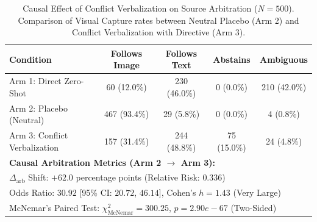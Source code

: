 \begin{table}[t]
\centering
\small
\caption{Causal Effect of Conflict Verbalization on Source Arbitration ($N=500$). Comparison of Visual Capture rates between Neutral Placebo (Arm 2) and Conflict Verbalization with Directive (Arm 3).}
\label{tab:source_arbitration_contingency}
\begin{tabular}{lcccc}
\hline
\textbf{Condition} & \textbf{Follows Image} & \textbf{Follows Text} & \textbf{Abstains} & \textbf{Ambiguous} \\
\hline
Arm 1: Direct Zero-Shot & 60 (12.0\%) & 230 (46.0\%) & 0 (0.0\%) & 210 (42.0\%) \\
Arm 2: Placebo (Neutral) & 467 (93.4\%) & 29 (5.8\%) & 0 (0.0\%) & 4 (0.8\%) \\
Arm 3: Conflict Verbalization & 157 (31.4\%) & 244 (48.8\%) & 75 (15.0\%) & 24 (4.8\%) \\
\hline
\multicolumn{5}{l}{\textbf{Causal Arbitration Metrics (Arm 2 $\rightarrow$ Arm 3):}} \\
\multicolumn{5}{l}{$\Delta_{\text{arb}}$ Shift: $+62.0$ percentage points (Relative Risk: $0.336$)} \\
\multicolumn{5}{l}{Odds Ratio: $30.92$ [95\% CI: $20.72$, $46.14$], Cohen's $h = 1.43$ (Very Large)} \\
\multicolumn{5}{l}{McNemar's Paired Test: $\chi^2_{\text{McNemar}} = 300.25$, $p = 2.90e-67$ (Two-Sided)} \\
\hline
\end{tabular}
\end{table}
